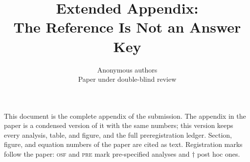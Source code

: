 \documentclass{article}
\title{Extended Appendix:\\The Reference Is Not an Answer Key}
\author{Anonymous authors\\Paper under double-blind review}
\begin{document}
\maketitle
\raggedbottom

\noindent This document is the complete appendix of the submission. The appendix in the paper is a condensed version of it with the same numbers; this version keeps every analysis, table, and figure, and the full preregistration ledger. Section, figure, and equation numbers of the paper are cited as text. Registration marks follow the paper: \textsc{osf} and \textsc{pre} mark pre-specified analyses and $\dagger$ post hoc ones.

\appendix
{}




\end{document}
